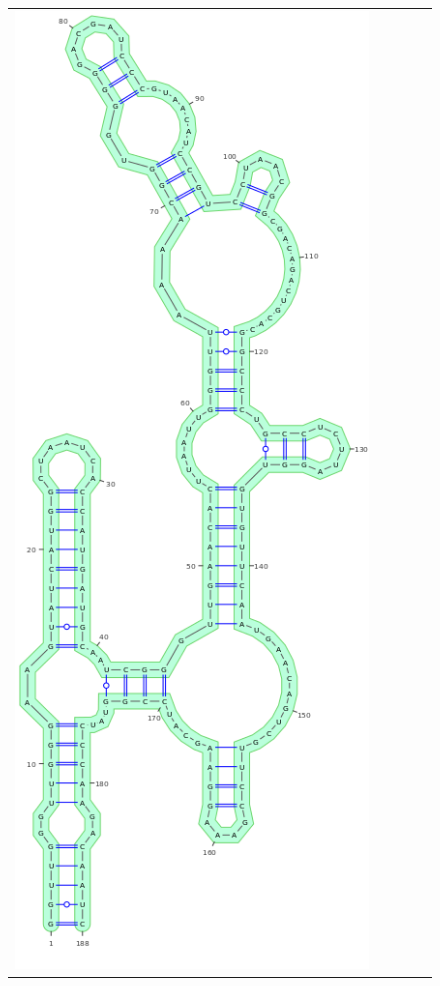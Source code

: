 \documentclass[11pt]{article} %
\begin{document}
\begin{figure}
\newcommand{\MyScale}{.26}

{\centering
	\begin{adjustbox}{max width=\textwidth,max height=\textheight,keepaspectratio}
\begin{tabular}{@{}c|cccc@{}}

 \includegraphics[scale=\MyScale]{graphs/Supp_structures/native_structure}&

\end{tabular}
\end{adjustbox}}
\end{figure}
\end{document}
